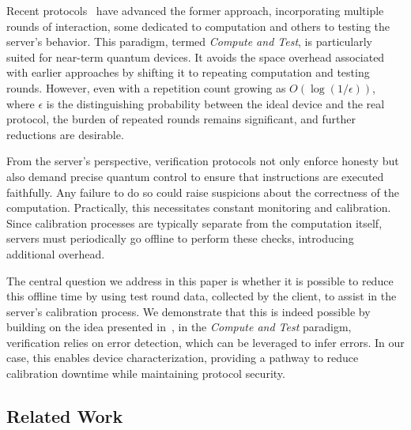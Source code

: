 Recent protocols~\cite{B18how, broadbent2025noiserobustnessdelegatedquantumcomputation, LMKO21verifying, KKLM22unifying} have advanced the former approach, incorporating multiple rounds of interaction, some dedicated to computation and others to testing the server's behavior. This paradigm, termed \emph{Compute and Test}, is particularly suited for near-term quantum devices. It avoids the space overhead associated with earlier approaches by shifting it to repeating computation and testing rounds. However, even with a repetition count growing as $O(\log(1/\epsilon))$, where $\epsilon$ is the distinguishing probability between the ideal device and the real protocol, the burden of repeated rounds remains significant, and further reductions are desirable.

From the server’s perspective, verification protocols not only enforce honesty but also demand precise quantum control to ensure that instructions are executed faithfully. Any failure to do so could raise suspicions about the correctness of the computation. Practically, this necessitates constant monitoring and calibration. Since calibration processes are typically separate from the computation itself, servers must periodically go offline to perform these checks, introducing additional overhead. 

The central question we address in this paper is whether it is possible to reduce this offline time by using test round data, collected by the client, to assist in the server's calibration process. We demonstrate that this is indeed possible by building on the idea presented in~\cite{KKLM22unifying}, in the \emph{Compute and Test} paradigm, verification relies on error detection, which can be leveraged to infer errors. In our case, this enables device characterization, providing a pathway to reduce calibration downtime while maintaining protocol security.

\subsection{Related Work}

